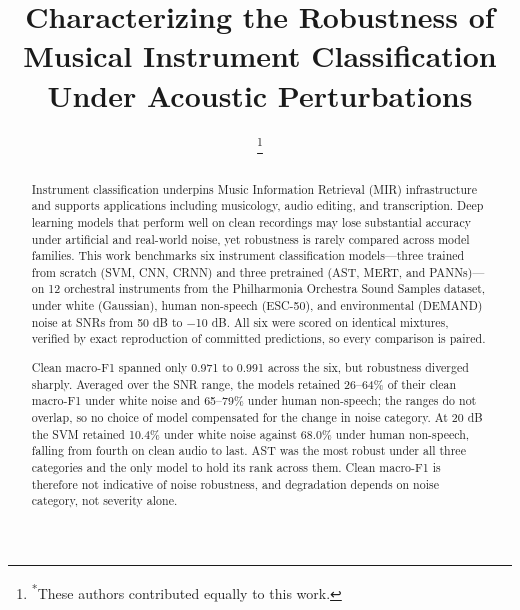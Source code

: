 \documentclass[conference]{IEEEtran}
\begin{document}
\title{Characterizing the Robustness of Musical Instrument Classification Under Acoustic Perturbations}

\author{
\and
{}
\and
{}
\thanks{\textsuperscript{*}These authors contributed equally to this work.}
}

\maketitle

\begin{abstract}
Instrument classification underpins Music Information Retrieval (MIR) infrastructure and supports applications including musicology, audio editing, and transcription. Deep learning models that perform well on clean recordings may lose substantial accuracy under artificial and real-world noise, yet robustness is rarely compared across model families. This work benchmarks six instrument classification models---three trained from scratch (SVM, CNN, CRNN) and three pretrained (AST, MERT, and PANNs)---on 12 orchestral instruments from the Philharmonia Orchestra Sound Samples dataset, under white (Gaussian), human non-speech (ESC-50), and environmental (DEMAND) noise at SNRs from 50 dB to $-$10 dB. All six were scored on identical mixtures, verified by exact reproduction of committed predictions, so every comparison is paired.

Clean macro-F1 spanned only 0.971 to 0.991 across the six, but robustness diverged sharply. Averaged over the SNR range, the models retained 26--64\% of their clean macro-F1 under white noise and 65--79\% under human non-speech; the ranges do not overlap, so no choice of model compensated for the change in noise category. At 20 dB the SVM retained 10.4\% under white noise against 68.0\% under human non-speech, falling from fourth on clean audio to last. AST was the most robust under all three categories and the only model to hold its rank across them. Clean macro-F1 is therefore not indicative of noise robustness, and degradation depends on noise category, not severity alone.
\end{abstract}
\end{document}
